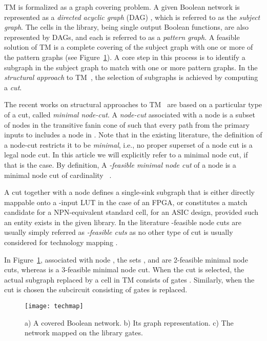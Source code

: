 \documentclass[journal]{IEEEtran}
\begin{document}
TM is formalized as a graph covering problem. A given Boolean network is represented as a \emph{directed acyclic graph} (DAG) , which is referred to as the \emph{subject graph}.  The cells in the library, being single output Boolean functions, are also represented by DAGs, and each is referred to as a \textit{pattern graph}.  A feasible solution of TM is a complete covering of the subject graph with one or more of the pattern graphs (see Figure~\ref{fig:covering}). A core step in this process is to identify a subgraph in the subject graph to match with one or more pattern graphs. In the \emph{structural approach} to TM~\cite{chatterjee_thesis07}, the selection of subgraphs is achieved by computing a \emph{cut}.

The recent works on structural approaches to TM~\cite{Mishchenko2007,Chatterjee2006,Cong1999,Ling2007} are based on a particular type of a cut, called \emph{minimal node-cut}.  A \emph{node-cut}  associated with a node  is a subset of nodes in the transitive fanin cone of  such that every path from the primary inputs to  includes a node in . Note that in the existing literature, the definition of a node-cut restricts it to be \textit{minimal}, i.e., no proper superset of a node cut is a legal node cut. In this article we will explicitly refer to a minimal node cut, if that is the case. By definition, A \emph{-feasible minimal node cut} of a node  is a minimal node cut of cardinality ~\cite{Chatterjee2006}. 

A cut together with a node  defines a single-sink subgraph that is either directly mappable onto a -input LUT in the case of an FPGA,  or constitutes a match candidate for a NPN-equivalent standard cell, for an ASIC design, provided such an entity exists in the given library. In the literature -feasible node cuts are usually simply referred as \emph{-feasible cuts} as no other type of cut is usually considered for technology mapping \cite{Mishchenko2007,Chatterjee2006,Cong1999,Ling2007}.  

In Figure~\ref{fig:covering}, associated with node ,  the sets , and  are 2-feasible minimal node cuts, whereas  is a 3-feasible minimal node cut. When the cut  is selected, the actual subgraph replaced by a cell in TM consists of gates .  Similarly, when the cut  is chosen the subcircuit consisting of gates  is replaced.

\begin{figure}[h]
\centering
\texttt{[image: techmap]}
\caption{a) A covered Boolean network. b) Its graph representation. c)   The network mapped on the library gates.}
\label{fig:covering}
\end{figure}
\end{document}
